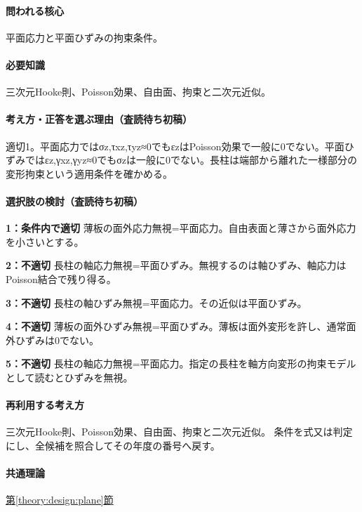\paragraph{問われる核心} 平面応力と平面ひずみの拘束条件。

\paragraph{必要知識} 三次元Hooke則、Poisson効果、自由面、拘束と二次元近似。

\paragraph{考え方・正答を選ぶ理由（査読待ち初稿）} 適切1。平面応力ではσz,τxz,τyz≈0でもεzはPoisson効果で一般に0でない。平面ひずみではεz,γxz,γyz≈0でもσzは一般に0でない。長柱は端部から離れた一様部分の変形拘束という適用条件を確かめる。

\paragraph{選択肢の検討（査読待ち初稿）}\mbox{}\par

\noindent\textbf{1：条件内で適切} 薄板の面外応力無視=平面応力。自由表面と薄さから面外応力を小さいとする。\par

\noindent\textbf{2：不適切} 長柱の軸応力無視=平面ひずみ。無視するのは軸ひずみ、軸応力はPoisson結合で残り得る。\par

\noindent\textbf{3：不適切} 長柱の軸ひずみ無視=平面応力。その近似は平面ひずみ。\par

\noindent\textbf{4：不適切} 薄板の面外ひずみ無視=平面ひずみ。薄板は面外変形を許し、通常面外ひずみは0でない。\par

\noindent\textbf{5：不適切} 長柱の軸応力無視=平面応力。指定の長柱を軸方向変形の拘束モデルとして読むとひずみを無視。\par

\paragraph{再利用する考え方} 三次元Hooke則、Poisson効果、自由面、拘束と二次元近似。 条件を式又は判定にし、全候補を照合してその年度の番号へ戻す。

\paragraph{共通理論} \hyperref[theory:design:plane]{第\ref*{theory:design:plane}節}

